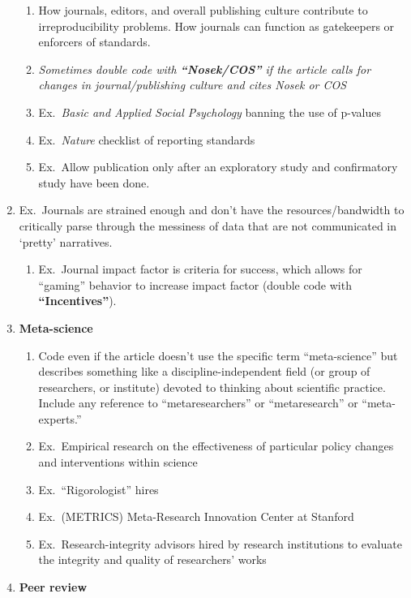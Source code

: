 \documentclass[
]{scrartcl}
\begin{document}
\begin{enumerate}
  \begin{enumerate}

  \item
    How journals, editors, and overall publishing culture contribute to
    irreproducibility problems. How journals can function as gatekeepers
    or enforcers of standards.
  \item
    \emph{Sometimes double code with \textbf{``Nosek/COS''} if the
    article calls for changes in journal/publishing culture and cites
    Nosek or COS}
  \item
    Ex.~\emph{Basic and Applied Social Psychology} banning the use of
    p-values
  \item
    Ex.~\emph{Nature} checklist of reporting standards
  \item
    Ex.~Allow publication only after an exploratory study and
    confirmatory study have been done.
  \end{enumerate}

  \item Ex.~Journals are strained enough and don't have the
  resources/bandwidth to critically parse through the messiness of data
  that are not communicated in `pretty' narratives.

  \begin{enumerate}
  \item
    Ex.~Journal impact factor is criteria for success, which allows for
    ``gaming'' behavior to increase impact factor (double code with
    \textbf{``Incentives''}).
  \end{enumerate}
\item
  \textbf{Meta-science}

  \begin{enumerate}

  \item
    Code even if the article doesn't use the specific term
    ``meta-science'' but describes something like a
    discipline-independent field (or group of researchers, or institute)
    devoted to thinking about scientific practice. Include any reference
    to ``metaresearchers'' or ``metaresearch'' or ``meta-experts.''
  \item
    Ex.~Empirical research on the effectiveness of particular policy
    changes and interventions within science
  \item
    Ex.~``Rigorologist'' hires
  \item
    Ex.~(METRICS) Meta-Research Innovation Center at Stanford
  \item
    Ex.~Research-integrity advisors hired by research institutions to
    evaluate the integrity and quality of researchers' works
  \end{enumerate}
\item
  \textbf{Peer review}


\end{enumerate}
\end{document}
